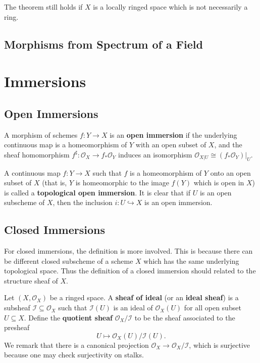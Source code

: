 \documentclass[12pt]{book}
\newcommand{\inlinedef}[1]{\textcolor{oxfordblue}{\bfseries #1}}
\theoremstyle{definition}
\begin{document}
	\begin{remark}
		The theorem still holds if $X$ is a locally ringed space which is not necessarily a ring.
	\end{remark}
	
	\subsection*{Morphisms from Spectrum of a Field}
	
	\section{Immersions}
	
	
	
	\subsection*{Open Immersions}
	
	\begin{definition}
		A morphism of schemes $f \colon Y \to X$ is an \inlinedef{open immersion} if the underlying continuous map is a homeomorphism of $Y$ with an open subset of $X$, and the sheaf homomorphism $f^\sharp\colon \mathcal{O}_X \to f_\ast \mathcal{O}_{Y}$ induces an isomorphism $\mathcal{O}_{X|U} \cong (f_\ast \mathcal{O}_Y)|_{U}$.
	\end{definition}
	
	A continuous map $f \colon Y \to X$ such that $f$ is a homeomorphism of $Y$ onto an open subset of $X$ (that is, $Y$ is homeomorphic to the image $f(Y)$ which is open in $X$) is called a \inlinedef{topological open immersion}. It is clear that if $U$ is an open subscheme of $X$, then the inclusion $i \colon U \hookrightarrow X$ is an open immersion.
	
	\subsection*{Closed Immersions}
		
	For closed immersions, the definition is more involved. This is because there can be different closed subscheme of a scheme $X$ which has the same underlying topological space. Thus the definition of a closed immersion should related to the structure sheaf of $X$. 
	
	Let $(X, \mathcal{O}_X)$ be a ringed space. A \inlinedef{sheaf of ideal} (or an \inlinedef{ideal sheaf}) is a subsheaf $\mathcal{I} \subseteq \mathcal{O}_X$ such that $\mathcal{I}(U)$ is an ideal of $\mathcal{O}_X(U)$ for all open subset $U \subseteq X$. 
	Define the \inlinedef{quotient sheaf} $\mathcal{O}_X/\mathcal{I}$ to be the sheaf associated to the presheaf
	\begin{equation*}
		U \mapsto \mathcal{O}_X(U)/\mathcal{I}(U).
	\end{equation*}
	We remark that there is a canonical projection $\mathcal{O}_X \to \mathcal{O}_X/\mathcal{I}$, which is surjective because one may check surjectivity on stalks.
	
\end{document}
